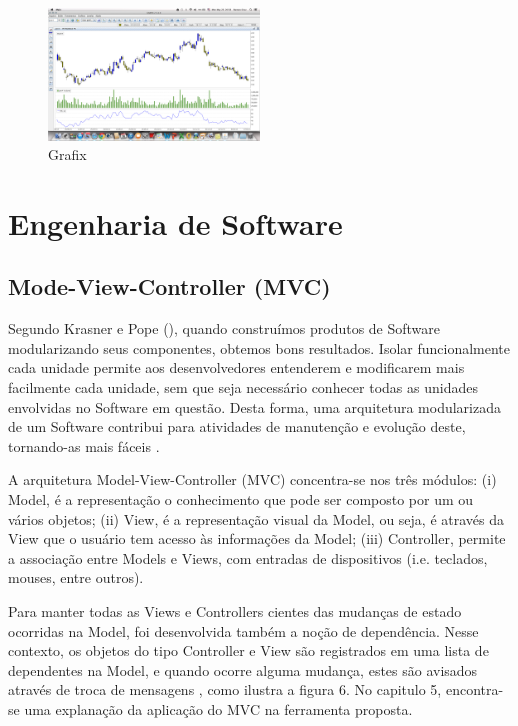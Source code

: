 \begin{figure}[h]
\centering
\label{f05}
\includegraphics[width=0.5\textwidth]{figuras/f05}
\caption{Grafix}

\end{figure}

\section{Engenharia de Software}
\subsection{Mode-View-Controller (MVC)}

Segundo Krasner e Pope (\citeyear{krasner1988}), quando construímos produtos de Software modularizando seus componentes, obtemos bons resultados. Isolar funcionalmente cada unidade permite aos desenvolvedores entenderem e modificarem mais facilmente cada unidade, sem que seja necessário conhecer todas as unidades envolvidas no Software em questão. Desta forma, uma arquitetura modularizada de um Software contribui para atividades de manutenção e evolução deste, tornando-as mais fáceis \cite[p. 1]{krasner1988}.


A arquitetura Model-View-Controller (MVC) concentra-se nos três módulos: (i) Model, é a representação o conhecimento que pode ser composto por um ou vários objetos; (ii) View, é a representação visual da Model, ou seja, é através da View que o usuário tem acesso às informações da Model; (iii) Controller, permite a associação entre Models e Views, com entradas de dispositivos (i.e. teclados, mouses, entre outros)\cite[p. 2]{krasner1988}.



Para manter todas as Views e Controllers cientes das mudanças de estado ocorridas na Model, foi desenvolvida também a noção de dependência. Nesse contexto, os objetos do tipo Controller e View são registrados em uma lista de dependentes na Model, e quando ocorre alguma mudança, estes são avisados através de troca de mensagens \cite[p. 2]{krasner1988}, como ilustra a figura 6. No capitulo 5, encontra-se uma explanação da aplicação do MVC na ferramenta proposta.

